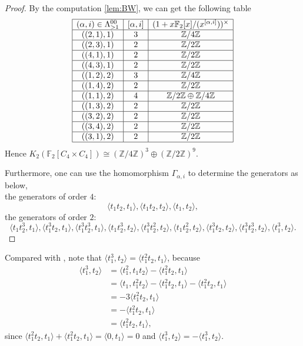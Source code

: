 \begin{proof}
	By the computation \ref{lem:BW}, we can get the following table
	\[\begin{array}{|c|c|c|c|}
\hline
(\alpha,i)\in \Lambda^{00}_{>1} & [\alpha,i] & (1+x \mathbb{F}_2[x]/(x^{[\alpha,i]}))^{\times} \\
\hline
((2,1),1)  & 3 & \mathbb{Z}/4 \mathbb{Z}\\
\hline
((2,3),1)  & 2& \mathbb{Z}/2 \mathbb{Z} \\
\hline
((4,1),1)  & 2& \mathbb{Z}/2 \mathbb{Z} \\
\hline
((4,3),1)  & 2& \mathbb{Z}/2 \mathbb{Z} \\
\hline
((1,2),2)  & 3& \mathbb{Z}/4 \mathbb{Z} \\
\hline
((1,4),2)  & 2& \mathbb{Z}/2 \mathbb{Z} \\
\hline
((1,1),2)  & 4& \mathbb{Z}/2 \mathbb{Z}\oplus \mathbb{Z}/4 \mathbb{Z} \\
\hline
((1,3),2)  & 2& \mathbb{Z}/2 \mathbb{Z} \\
\hline
((3,2),2)  & 2& \mathbb{Z}/2 \mathbb{Z} \\
\hline
((3,4),2)  & 2& \mathbb{Z}/2 \mathbb{Z} \\
\hline
((3,1),2)  & 2& \mathbb{Z}/2 \mathbb{Z}\\
\hline
\end{array}\]
Hence $K_2(\mathbb{F}_2[C_4\times C_4])  \cong (\mathbb{Z}/4 \mathbb{Z})^3 \oplus (\mathbb{Z}/2 \mathbb{Z})^9$.

Furthermore, one can use the homomorphism $\Gamma_{\alpha,i}$ to determine the generators as below,\\
the generators of order $4$:
\[\langle t_1t_2,t_1 \rangle, \langle t_1t_2,t_2 \rangle, \langle t_1,t_2 \rangle,\] 
the generators of order $2$:
\[\langle t_1t_2^3,t_1 \rangle, \langle t_1^3t_2,t_1 \rangle, \langle t_1^3t_2^3,t_1 \rangle,\langle t_1t_2^3,t_2 \rangle, \langle t_1^3t_2^2,t_2 \rangle, \langle t_1t_2^2,t_2 \rangle,\langle t_1^3t_2,t_2 \rangle, \langle t_1^3t_2^3,t_2 \rangle, \langle t_1^3,t_2 \rangle.\]
\end{proof}
\begin{remark}
	Compared with \cite{陈虹:419}, note that $\langle t_1^3,t_2 \rangle=\langle t_1^2t_2,t_1\rangle$, because
	\begin{align*}
	\langle t_1^3,t_2 \rangle &= \langle t_1^2,t_1t_2 \rangle-\langle t_1^2t_2,t_1 \rangle \\
		&= \langle t_1,t_1^2t_2 \rangle -\langle t_1^2t_2,t_1 \rangle-\langle t_1^2t_2,t_1 \rangle\\
		&= -3\langle t_1^2t_2,t_1 \rangle\\
		&= -\langle t_1^2t_2,t_1 \rangle \\
		&=\langle t_1^2t_2,t_1 \rangle,
	\end{align*}
	since $\langle t_1^2t_2,t_1 \rangle+\langle t_1^2t_2,t_1 \rangle=\langle 0,t_1\rangle =0$ and $\langle t_1^3,t_2 \rangle=-\langle t_1^3,t_2 \rangle$.
\end{remark}






